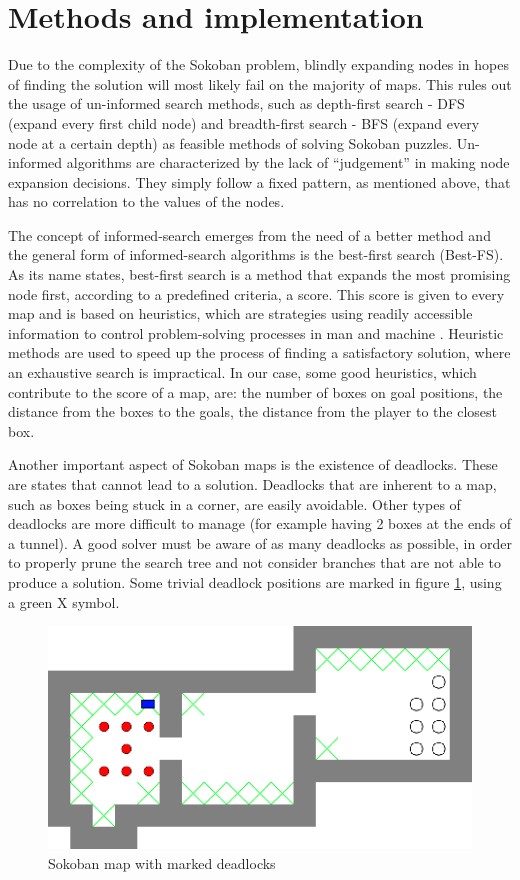 \section{Methods and implementation}\label{sec:methods}
Due to the complexity of the Sokoban problem, blindly expanding nodes in hopes of finding the solution will most likely fail on the majority of maps. This rules out the usage of un-informed search methods, such as depth-first search - DFS (expand every first child node) and breadth-first search - BFS (expand every node at a certain depth) as feasible methods of solving Sokoban puzzles. Un-informed algorithms are characterized by the lack of ``judgement'' in making node expansion decisions. They simply follow a fixed pattern, as mentioned above, that has no correlation to the values of the nodes.

The concept of informed-search emerges from the need of a better method and the general form of informed-search algorithms is the best-first search (Best-FS). As its name states, best-first search is a method that expands the most promising node first, according to a predefined criteria, a score. This score is given to every map and is based on heuristics, which are  strategies using readily accessible information to control problem-solving processes in man and machine \cite{pearl1984heuristics}. Heuristic methods are used to speed up the process of finding a satisfactory solution, where an exhaustive search is impractical. In our case, some good heuristics, which contribute to the score of a map, are: the number of boxes on goal positions, the distance from the boxes to the goals, the distance from the player to the closest box.

Another important aspect of Sokoban maps is the existence of deadlocks. These are states that cannot lead to a solution. Deadlocks that are inherent to a map, such as boxes being stuck in a corner, are easily avoidable. Other types of deadlocks are more difficult to manage (for example having 2 boxes at the ends of a tunnel). A good solver must be aware of as many deadlocks as possible, in order to properly prune the search tree and not consider branches that are not able to produce a solution. Some trivial deadlock positions are marked in figure \ref{fig:sokoban_map}, using a green X symbol. 

\begin{figure}[h]
\includegraphics[width=\columnwidth]{./images/deadlocks.png}
\caption{Sokoban map with marked deadlocks}
\label{fig:sokoban_map}
\end{figure}

